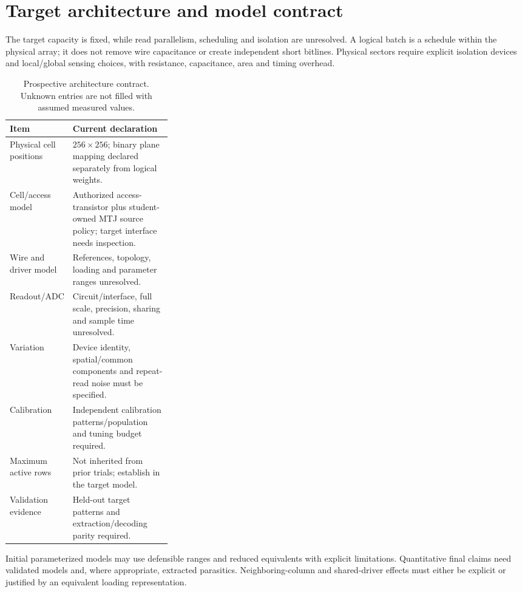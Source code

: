 \section{Target architecture and model contract}

The target capacity is fixed, while read parallelism, scheduling and isolation are
unresolved. A logical batch is a schedule within the physical array; it does not remove
wire capacitance or create independent short bitlines. Physical sectors require explicit
isolation devices and local/global sensing choices, with resistance, capacitance, area
and timing overhead.

\begin{table}[htbp]\centering\small
\begin{tabularx}{\linewidth}{@{}p{0.31\linewidth}X@{}}\toprule
Item & Current declaration\\\midrule
Physical cell positions & $256\times256$; binary plane mapping declared separately from logical weights.\\
Cell/access model & Authorized access-transistor plus student-owned MTJ source policy; target interface needs inspection.\\
Wire and driver model & References, topology, loading and parameter ranges unresolved.\\
Readout/ADC & Circuit/interface, full scale, precision, sharing and sample time unresolved.\\
Variation & Device identity, spatial/common components and repeat-read noise must be specified.\\
Calibration & Independent calibration patterns/population and tuning budget required.\\
Maximum active rows & Not inherited from prior trials; establish in the target model.\\
Validation evidence & Held-out target patterns and extraction/decoding parity required.\\\bottomrule
\end{tabularx}
\caption{Prospective architecture contract. Unknown entries are not filled with assumed measured values.}
\end{table}

Initial parameterized models may use defensible ranges and reduced equivalents with
explicit limitations. Quantitative final claims need validated models and, where
appropriate, extracted parasitics. Neighboring-column and shared-driver effects must
either be explicit or justified by an equivalent loading representation.

